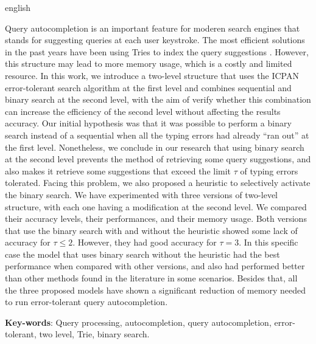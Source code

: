 \documentclass[
	12pt,				%
	openright,			%
	twoside,			%
	a4paper,			%
	english,			%
	spanish,			%
	brazil,				%
	]{abntex2}
\begin{document}
\newpage
\begin{resumo}[Abstract]
 \begin{otherlanguage*}{english}

Query autocompletion is an important feature for moderen search engines that stands for suggesting queries at each user keystroke. The most efficient solutions in the past years have been using Tries to index the query suggestions \citep{ji2009efficient, li2011efficient, xiao2013efficient, deng2016meta, zhou2016beva}. However, this structure may lead to more memory usage, which is a costly and limited resource. In this work, we introduce a two-level structure that uses the ICPAN \citep{li2011efficient} error-tolerant search algorithm at the first level and combines sequential and binary search at the second level, with the aim of verify whether this combination can increase the efficiency of the second level without affecting the results accuracy. Our initial hypothesis was that it was possible to perform a binary search instead of a sequential when all the typing errors had already ``ran out'' at the first level. Nonetheless, we conclude in our research that using binary search at the second level prevents the method of retrieving some query suggestions, and also makes it retrieve some suggestions that exceed the limit $\tau$ of typing errors tolerated. Facing this problem, we also proposed a heuristic to selectively activate the binary search. We have experimented with three versions of two-level structure, with each one having a modification at the second level. We compared their accuracy levels, their performances, and their memory usage. Both versions that use the binary search with and without the heuristic showed some lack of accuracy for $\tau \leq 2$. However, they had good accuracy for $\tau=3$. In this specific case the model that uses binary search without the heuristic had the best performance when compared with other versions, and also had performed better than other methods found in the literature in some scenarios. Besides that, all the three proposed models have shown a significant reduction of memory needed to run error-tolerant query autocompletion.


  \vspace{\onelineskip}
 
  \noindent 
  \textbf{Key-words}: Query processing, autocompletion, query autocompletion, error-tolerant, two level, Trie, binary search.
 \end{otherlanguage*}
\end{resumo}
\newpage
 
\end{document}
